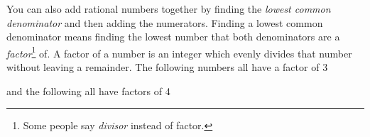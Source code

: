         \label{m38346*id179295}You can also add rational numbers together by finding the \textsl{lowest common denominator} and then adding the numerators. Finding a lowest common
denominator means finding the lowest number that both denominators are a
\textsl{factor}\label{m38346*uid63}\footnote{Some people say \textsl{divisor} instead of factor.}
of. A factor of a number is an integer which evenly divides that number without
leaving a remainder. The following numbers all have a factor of 3\par 
        \label{m38346*id179327}\nopagebreak\noindent{}
        \label{m38346*id179373}and the following all have factors of 4\par 
        \label{m38346*id179379}\nopagebreak\noindent{}
